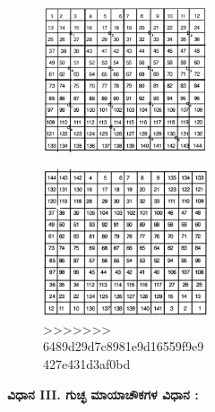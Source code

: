 \begin{figure}[H]
\begin{figure}[H]
\begin{figure}[h]
\begin{figure}[H]
\includegraphics[scale=.8]{src/figures/chap3/fig3.28.jpg}
\end{figure}
\begin{figure}[H]
\includegraphics[scale=.8]{src/figures/chap3/fig3.29.jpg}
>>>>>>> 6489d29d7c8981e9d16559f9e9427e431d3af0bd
\end{figure}

\newpage

\smallskip
\textbf{ವಿಧಾನ III. ಗುಚ್ಛ ಮಾಯಾಚೌಕಗಳ ವಿಧಾನ :}
\smallskip


\end{figure}
\end{figure}
\end{figure}
